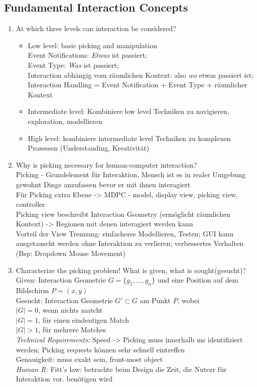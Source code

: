 \subsection{Fundamental Interaction Concepts}
\begin{enumerate}
	\item At which three levels can interaction be considered?
	\begin{itemize}
		\item Low level: basic picking and manipulation\\
		Event Notifications: \textit{Etwas} ist passiert;\\
		Event Type: \textit{Was} ist passiert;\\
		Interaction abhängig vom räumlichen Kontext: also \textit{wo} etwas passiert ist;\\
		Interaction Handling = Event Notification + Event Type + räumlicher Kontext
		\item Intermediate level: Kombiniere low level Techniken zu navigieren, exploration, modellieren
		\item High level: kombiniere intermediate level Techniken zu komplexen Prozessen (Understanding, Kreativität)
	\end{itemize}
	
	\item Why is picking necessary for human-computer interaction?\\
	Picking - Grundelement für Interaktion, Mensch ist es in realer Umgebung gewohnt Dinge anzufassen bevor er mit ihnen interagiert\\
	Für Picking extra Ebene -> MDPC - model, display view, picking view, controller\\
	Picking view beschreibt Interaction Geometry (ermöglicht räumlichen Kontext) -> Regionen mit denen interagiert werden kann\\
	Vorteil der View Trennung: einfacheres Modellieren, Testen; GUI kann ausgetauscht werden ohne Interaktion zu verlieren; verbessertes Verhalten (Bsp: Dropdown Mouse Movement)
	
	\item Characterize the picking problem! What is given, what is sought(gesucht)?
	Given: Interaction Geometrie $G = \{g_1,\ldots, g_n\}$ und eine Position auf dem Bildschirm $P = (x,y)$\\
	Gesucht: Interaction Geometrie $G' \subset G$ am Punkt $P$, wobei\\
	$|G| = 0$, wenn nichts matcht\\
	$|G| = 1$, für einen eindeutigen Match\\
	$|G| > 1$, für mehrere Matches\\
	\textit{Technical Requirements:} Speed -> Picking muss innerhalb ms identifiziert werden; Picking requests können sehr schnell eintreffen\\
	Genauigkeit: muss exakt sein, front-most object\\	
	\textit{Human R:} Fitt's law: betrachte beim Design die Zeit, die Nutezr für Interaktion vor. benötigen wird
	

\end{enumerate}
